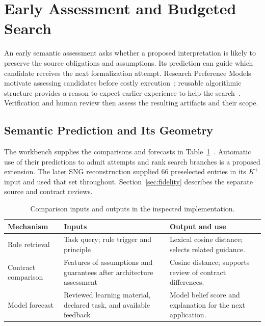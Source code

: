 \section{Early Assessment and Budgeted Search}
\label{app:semantic-budget}
An early semantic assessment asks whether a proposed interpretation is likely to preserve the source obligations and assumptions. Its prediction can guide which candidate receives the next formalization attempt. Research Preference Models motivate assessing candidates before costly execution~\cite{foster2026rpm}; reusable algorithmic structure provides a reason to expect earlier experience to help the search~\cite{e28030332}. Verification and human review then assess the resulting artifacts and their scope.

\subsection{Semantic Prediction and Its Geometry}
The workbench supplies the comparisons and forecasts in Table~\ref{tab:semantic-comparisons}~\cite{scpCheckpoint}. Automatic use of their predictions to admit attempts and rank search branches is a proposed extension. The later SNG reconstruction supplied 66 preselected entries in its $K^{+}$ input and used that set throughout. Section~\ref{sec:fidelity} describes the separate source and contract reviews.

\begin{table}[!htbp]
\caption{Comparison inputs and outputs in the inspected implementation.}
\label{tab:semantic-comparisons}
\centering\small
\begin{tabular}{@{}p{.20\linewidth}p{.43\linewidth}p{.31\linewidth}@{}}
\hline
Mechanism & Inputs & Output and use \\
\hline
Rule retrieval & Task query; rule trigger and principle & Lexical cosine distance; selects related guidance. \\
Contract comparison & Features of assumptions and guarantees after architecture assessment & Cosine distance; supports review of contract differences. \\
Model forecast & Reviewed learning material, declared task, and available feedback & Model belief score and explanation for the next application. \\
\hline
\end{tabular}
\end{table}

